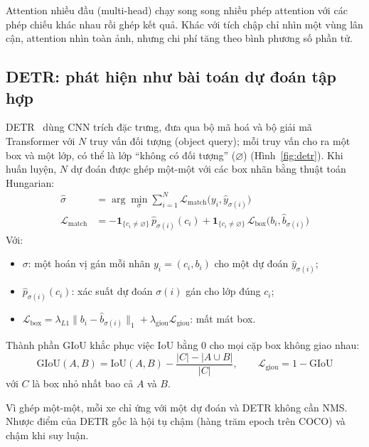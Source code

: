 Attention nhiều đầu (multi-head) chạy song song nhiều phép attention với các phép chiếu khác nhau rồi ghép kết quả.
Khác với tích chập chỉ nhìn một vùng lân cận, attention nhìn toàn ảnh, nhưng chi phí tăng theo bình phương số phần tử.

\subsection{DETR: phát hiện như bài toán dự đoán tập hợp}

DETR~\cite{carion2020detr} dùng CNN trích đặc trưng, đưa qua bộ mã hoá và bộ giải mã Transformer với $N$ truy vấn đối
tượng (object query); mỗi truy vấn cho ra một box và một lớp, có thể là lớp ``không có đối tượng'' ($\varnothing$)
(Hình~\ref{fig:detr}).
Khi huấn luyện, $N$ dự đoán được ghép một-một với các box nhãn bằng thuật toán Hungarian:
\begin{equation}
  \begin{split}
    \hat{\sigma} &= \arg\min_{\sigma} \sum_{i=1}^{N} \mathcal{L}_{\mathrm{match}}\big(y_i, \hat{y}_{\sigma(i)}\big) \\
    \mathcal{L}_{\mathrm{match}} &= -\mathbf{1}_{\{c_i \neq \varnothing\}}\, \hat{p}_{\sigma(i)}(c_i)
      + \mathbf{1}_{\{c_i \neq \varnothing\}}\, \mathcal{L}_{\mathrm{box}}\big(b_i, \hat{b}_{\sigma(i)}\big)
  \end{split}
  \label{eq:detr-match}
\end{equation}
Với:
\begin{itemize}
  \item $\sigma$: một hoán vị gán mỗi nhãn $y_i = (c_i, b_i)$ cho một dự đoán $\hat{y}_{\sigma(i)}$;
  \item $\hat{p}_{\sigma(i)}(c_i)$: xác suất dự đoán $\sigma(i)$ gán cho lớp đúng $c_i$;
  \item $\mathcal{L}_{\mathrm{box}} = \lambda_{L1} \lVert b_i - \hat{b}_{\sigma(i)} \rVert_1 +
        \lambda_{\mathrm{giou}} \mathcal{L}_{\mathrm{giou}}$: mất mát box.
\end{itemize}

Thành phần GIoU khắc phục việc IoU bằng 0 cho mọi cặp box không giao nhau:
\begin{equation}
  \mathrm{GIoU}(A, B) = \mathrm{IoU}(A, B) - \frac{|C| - |A \cup B|}{|C|},
  \qquad \mathcal{L}_{\mathrm{giou}} = 1 - \mathrm{GIoU}
  \label{eq:giou}
\end{equation}
với $C$ là box nhỏ nhất bao cả $A$ và $B$.

Vì ghép một-một, mỗi xe chỉ ứng với một dự đoán và DETR không cần NMS. Nhược điểm của DETR gốc là hội tụ chậm (hàng
trăm epoch trên COCO) và chậm khi suy luận.

